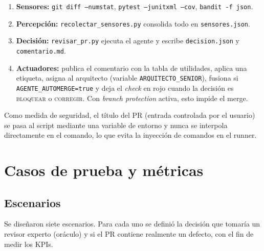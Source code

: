 \documentclass[11pt,a4paper]{article}
\begin{document}
\begin{enumerate}[leftmargin=*]
\item \textbf{Sensores:} \texttt{git diff --numstat}, \texttt{pytest --junitxml --cov}, \texttt{bandit -f json}.
\item \textbf{Percepción:} \texttt{recolectar\_sensores.py} consolida todo en \texttt{sensores.json}.
\item \textbf{Decisión:} \texttt{revisar\_pr.py} ejecuta el agente y escribe \texttt{decision.json} y \texttt{comentario.md}.
\item \textbf{Actuadores:} publica el comentario con la tabla de utilidades, aplica una etiqueta,
      asigna al arquitecto (variable \texttt{ARQUITECTO\_SENIOR}), fusiona si
      \texttt{AGENTE\_AUTOMERGE=true} y deja el \textit{check} en rojo cuando la decisión es
      \textsc{bloquear} o \textsc{corregir}. Con \textit{branch protection} activa, esto impide el merge.
\end{enumerate}

\noindent Como medida de seguridad, el título del PR (entrada controlada por el usuario) se pasa al
script mediante una variable de entorno y nunca se interpola directamente en el comando, lo que evita
la inyección de comandos en el runner.

\section{Casos de prueba y métricas}

\subsection{Escenarios}

Se diseñaron siete escenarios. Para cada uno se definió la decisión que tomaría un revisor experto
(oráculo) y si el PR contiene realmente un defecto, con el fin de medir los KPIs.
\end{document}
